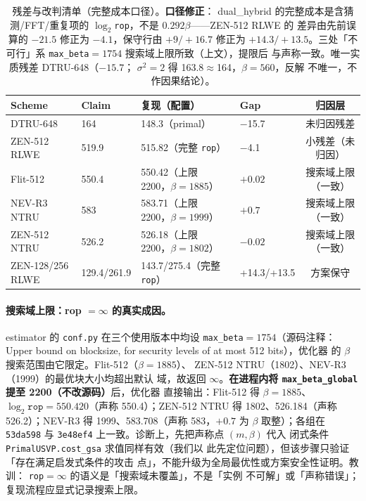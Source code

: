 \documentclass[11pt,a4paper]{ctexart}
\begin{document}
\begin{table}[htbp]\centering\small
\begin{tabular}{@{}llllc@{}}
\toprule
Scheme & Claim & 复现（配置） & Gap & 归因层 \\
\midrule
DTRU-648 & 164 & 148.3（primal） & $-$15.7 & 未归因残差 \\
ZEN-512 RLWE & 519.9 & 515.82（完整 \texttt{rop}） & $-$4.1 & 小残差（未归因） \\
\midrule
Flit-512 & 550.4 & 550.42（上限 2200，$\beta{=}1885$） & $+0.02$ & 搜索域上限（一致） \\
NEV-R3 NTRU & 583 & 583.71（上限 2200，$\beta{=}1999$） & $+0.7$ & 搜索域上限（一致） \\
ZEN-512 NTRU & 526.2 & 526.18（上限 2200，$\beta{=}1802$） & $-0.02$ & 搜索域上限（一致） \\
\midrule
ZEN-128/256 RLWE & 129.4/261.9 & 143.7/275.4（完整 \texttt{rop}） & +14.3/+13.5 & 方案保守 \\
\bottomrule
\end{tabular}
\caption{残差与改判清单（完整成本口径）。\textbf{口径修正}：
dual\_hybrid 的完整成本是含猜测/FFT/重复项的
$\log_2$\texttt{rop}，不是 $0.292\beta$——ZEN-512 RLWE 的
差异由先前误算的 $-21.5$ 修正为 $-4.1$，保守行由
$+9/+16.7$ 修正为 $+14.3/+13.5$。三处「不可行」系
\texttt{max\_beta}$=1754$ 搜索域上限所致（上文），提限后
与声称一致。唯一实质残差 DTRU-648（$-15.7$；
$\sigma^2{=}2$ 得 163.8$\approx$164，$\beta{=}560$，反解
不唯一，不作因果结论）。}
\end{table}

\paragraph{搜索域上限：rop $= \infty$ 的真实成因。}
estimator 的 \texttt{conf.py} 在三个使用版本中均设
\texttt{max\_beta}$=1754$（源码注释：Upper bound on
blocksize, for security levels of at most 512 bits），优化器
的 $\beta$ 搜索范围由它限定。Flit-512（$\beta{=}1885$）、
ZEN-512 NTRU（1802）、NEV-R3（1999）的最优块大小均超出默认
域，故返回 $\infty$。\textbf{在进程内将
\texttt{max\_beta\_global} 提至 2200（不改源码）}后，优化器
直接输出：Flit-512 得 $\beta{=}1885$、
$\log_2\texttt{rop}{=}550.420$（声称 550.4）；ZEN-512 NTRU 得
1802、526.184（声称 526.2）；NEV-R3 得 1999、583.708（声称
583，$+0.7$ 为 $\beta$ 取整）；各组在 \texttt{53da598} 与
\texttt{3e48ef4} 上一致。诊断上，先把声称点 $(m,\beta)$ 代入
闭式条件 \texttt{PrimalUSVP.cost\_gsa} 求值同样有效（我们以
此先定位问题），但该步骤只验证「存在满足启发式条件的攻击
点」，不能升级为全局最优性或方案安全性证明。教训：
\texttt{rop}$=\infty$ 的语义是「搜索域未覆盖」，不是「实例
不可解」或「声称错误」；复现流程应显式记录搜索上限。
\end{document}
